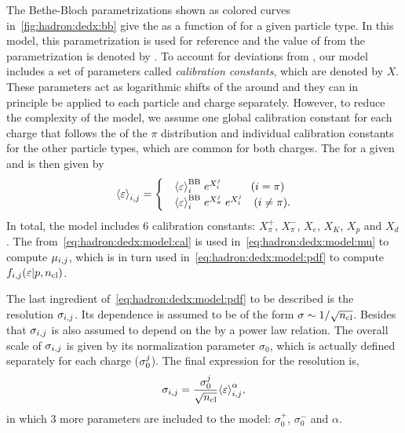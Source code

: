 The Bethe-Bloch parametrizations shown as colored curves
in~\cref{fig:hadron:dedx:bb} give the \meaneps as a
function of \pp for a given particle type.
In this model, this parametrization is used for reference
and the value of \meaneps from the parametrization
is denoted by \meanepsbb.
To account for deviations from \meanepsbb,
our model includes a set of parameters called
\textit{calibration constants}, which are denoted by $X$.
These parameters act as logarithmic shifts of the \meaneps
around \meanepsbb and they can in principle be applied
to each particle and charge separately. However, to reduce the complexity
of the model, we assume one global calibration constant
for each charge that follows the \meaneps of the $\pi$ distribution
and individual calibration constants for the other particle types,
which are common for both charges. The \meaneps for a
given \ipart and \ich is then given by
\begin{equation}
  \meaneps_{\ipart,\ich} =
  \begin{cases}
    & \meaneps_{\ipart}^\text{BB} \; e^{X_{\ipart}^{\ich}} \ \ \ \ \ \ \ \ (i=\pi) \\
    & \meaneps_{\ipart}^\text{BB} \; e^{X_{\pi}^{\ich}} \; e^{X_{\ipart}^{\ich}} \ \ \ (i\neq\pi).
  \end{cases}
  \label{eq:hadron:dedx:model:cal}
\end{equation}
In total, the model includes 6 calibration constants:
$X_{\pi}^{+}$, $X_{\pi}^{-}$, $X_{e}$, $X_{K}$, $X_{p}$ and $X_{d}$.
The \meaneps from~\cref{eq:hadron:dedx:model:cal} is used
in~\cref{eq:hadron:dedx:model:mu} to compute $\mu_{i,j}$,
which is in turn used in~\cref{eq:hadron:dedx:model:pdf}
to compute $f_{i,j}(\mbox{$\varepsilon$}|p,\mbox{$n_{\text{cl}}$})$.

The last ingredient of~\cref{eq:hadron:dedx:model:pdf}
to be described is the resolution $\sigma_{i,j}$. 
Its \ncl dependence is assumed to be of the form
$\sigma \sim 1/\sqrt{\mbox{$n_{\text{cl}}$}}$. Besides that $\sigma_{i,j}$
is also assumed to depend on the \meaneps by a power law relation.
The overall scale of $\sigma_{i,j}$ is given by its normalization
parameter $\sigma_0$, which is actually defined separately for each charge ($\sigma_0^{j}$).
The final expression for the resolution is,
\begin{equation}
  \sigma_{i,j} = \frac{\sigma_0^{j}}{\sqrt{\mbox{$n_{\text{cl}}$}}} \mbox{$\langle\varepsilon\rangle$}_{i,j}^{\alpha},
  \label{eq:hadron:dedx:model:sigma}
\end{equation}
in which 3 more parameters are included to the model: $\sigma_0^+$, $\sigma_0^-$ and $\alpha$. 


